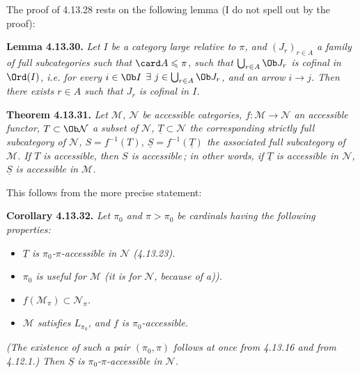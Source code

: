 The proof of 4.13.28 rests on the following lemma (I do not spell out by the proof): %

\textbf{Lemma 4.13.30.} \textit{Let $I$ be a category large relative to $\pi$, and $(J_r)_{r\in A}$ a family of full subcategories such that $\card A\leqslant\pi$, such that $\bigcup_{r\in A}\Ob J_r$ is cofinal in $\Ord(I)$, i.e. for every $i\in\Ob I$ $\exists\ j\in\bigcup_{r\in A}\Ob J_r$, and an arrow $i\longrightarrow j$. Then there exists $r\in A$ such that $J_r$ is cofinal in $I$.}

\textbf{Theorem 4.13.31.} \textit{Let $\mathcal{M}$, $\mathcal{N}$ be accessible categories, $f:\mathcal{M}\longrightarrow\mathcal{N}$ an accessible functor, $T\subset\Ob\mathcal{N}$ a subset of $\mathcal{N}$, $\underline{T}\subset\mathcal{N}$ the corresponding strictly full subcategory of $\mathcal{N}$, $S=f^{-1}(T)$, $\underline{S}=f^{-1}(\underline{T})$ the associated full subcategory of $\mathcal{M}$. If $T$ is accessible, then $S$ is accessible\,; in other words, if $\underline{T}$ is accessible in $\mathcal{N}$, $\underline{S}$ is accessible in $\mathcal{M}$.}

This follows from the more precise statement:

\textbf{Corollary 4.13.32.} \textit{Let $\pi_0$ and $\pi>\pi_0$ be cardinals having the following properties:}

\begin{itemize}[leftmargin=2.5em]
\item[\textit{a)}] \textit{$\underline{T}$ is $\pi_0$-$\pi$-accessible in $\mathcal{N}$ (4.13.23).}
\item[\textit{b)}] \textit{$\pi_0$ is useful for $\mathcal{M}$ (it is for $\mathcal{N}$, because of a)).}
\item[\textit{c)}] \textit{$f(\mathcal{M}_\pi)\subset\mathcal{N}_\pi$.}
\item[\textit{d)}] \textit{$\mathcal{M}$ satisfies $L_{\pi_0}$, and $f$ is $\pi_0$-accessible.}
\end{itemize}
\textit{(The existence of such a pair $(\pi_0,\pi)$ follows at once from 4.13.16 and from 4.12.1.) Then $\underline{S}$ is $\pi_0$-$\pi$-accessible in $\mathcal{N}$.}

